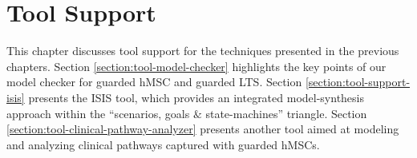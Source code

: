 \chapter{Tool Support\label{chapter:tool-support}}

This chapter discusses tool support for the techniques presented in the previous chapters. Section \ref{section:tool-model-checker} highlights the key points of our model checker for guarded hMSC and guarded LTS. Section \ref{section:tool-support-isis} presents the ISIS tool, which provides an integrated model-synthesis approach within the ``scenarios, goals $\&$ state-machines'' triangle. 
Section \ref{section:tool-clinical-pathway-analyzer} presents another tool aimed at modeling and analyzing clinical pathways captured with guarded hMSCs.





